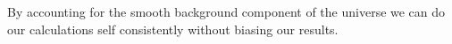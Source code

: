By accounting for the smooth background component of the universe we can do our calculations self consistently without biasing our results.
